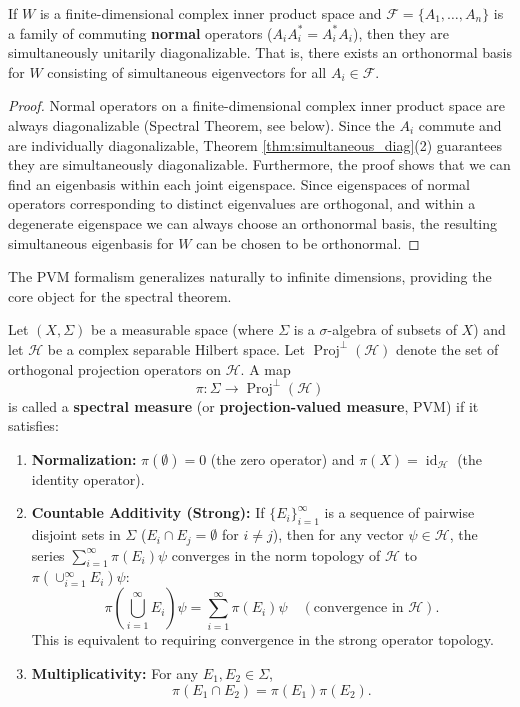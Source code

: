 \begin{corollary}
    \label{cor:simultaneous_unitary}
If $W$ is a finite-dimensional complex inner product space and $\mathcal{F} = \{A_1, \dots, A_n\}$ is a family of commuting \textbf{normal} operators ($A_i A_i^* = A_i^* A_i$), then they are simultaneously unitarily diagonalizable. That is, there exists an orthonormal basis for $W$ consisting of simultaneous eigenvectors for all $A_i \in \mathcal{F}$.
\end{corollary}
\begin{proof}
Normal operators on a finite-dimensional complex inner product space are always diagonalizable (Spectral Theorem, see below). Since the $A_i$ commute and are individually diagonalizable, Theorem \ref{thm:simultaneous_diag}(2) guarantees they are simultaneously diagonalizable. Furthermore, the proof shows that we can find an eigenbasis within each joint eigenspace. Since eigenspaces of normal operators corresponding to distinct eigenvalues are orthogonal, and within a degenerate eigenspace we can always choose an orthonormal basis, the resulting simultaneous eigenbasis for $W$ can be chosen to be orthonormal.
\end{proof}

The PVM formalism generalizes naturally to infinite dimensions, providing the core object for the spectral theorem.

\begin{definition}
\label{def:pvm_hilbert}
Let $(X, \Sigma)$ be a measurable space (where $\Sigma$ is a $\sigma$-algebra of subsets of $X$) and let $\mathcal{H}$ be a complex separable Hilbert space. Let $\operatorname{Proj}^{\perp}(\mathcal{H})$ denote the set of orthogonal projection operators on $\mathcal{H}$. A map
\[ \pi: \Sigma \to \operatorname{Proj}^{\perp}(\mathcal{H}) \]
is called a \textbf{spectral measure} (or \textbf{projection-valued measure}, PVM) if it satisfies:
\begin{enumerate}
    \item \textbf{Normalization:} $\pi(\emptyset) = 0$ (the zero operator) and $\pi(X) = \operatorname{id}_{\mathcal{H}}$ (the identity operator).
    \item \textbf{Countable Additivity (Strong):} If $\{E_i\}_{i=1}^\infty$ is a sequence of pairwise disjoint sets in $\Sigma$ ($E_i \cap E_j = \emptyset$ for $i \neq j$), then for any vector $\psi \in \mathcal{H}$, the series $\sum_{i=1}^\infty \pi(E_i)\psi$ converges in the norm topology of $\mathcal{H}$ to $\pi(\cup_{i=1}^\infty E_i)\psi$:
    \begin{equation*} \label{eq:4.26}
    \pi\left(\bigcup_{i=1}^\infty E_i\right)\psi = \sum_{i=1}^\infty \pi(E_i)\psi \quad (\text{convergence in } \mathcal{H}).
    \end{equation*}
    This is equivalent to requiring convergence in the strong operator topology.
    \item \textbf{Multiplicativity:} For any $E_1, E_2 \in \Sigma$,
    \[ \pi(E_1 \cap E_2) = \pi(E_1) \pi(E_2). \]
\end{enumerate}
\end{definition}

